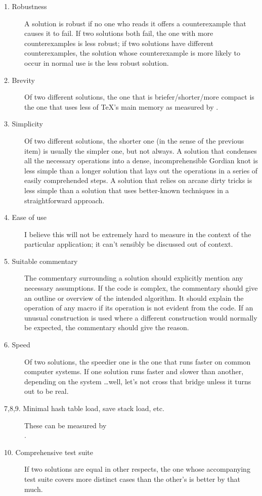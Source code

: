 \begin{description}
\item[1. Robustness] A solution is robust if no one who reads it offers a
counterexample that causes it to fail.  If two solutions both fail, the
one with more counterexamples is less robust; if two solutions have
different counterexamples, the solution whose counterexample is more
likely to occur in normal use is the less robust solution.

\item[2. Brevity] Of two different solutions, the one that is
briefer/shorter/more compact is the one that uses less of TeX's main
memory as measured by \cmd{\tracingstats}.

\item[3. Simplicity] Of two different solutions, the shorter one (in the
sense of the previous item) is usually the simpler one, but not always.
A solution that condenses all the necessary operations into a dense,
incomprehensible Gordian knot is less simple than a longer solution
that lays out the operations in a series of easily comprehended steps.
A solution that relies on arcane dirty tricks is less simple than a
solution that uses better-known techniques in a straightforward
approach.

\item[4. Ease of use] I believe this will not be extremely hard to measure in
the context of the particular application; it can't sensibly be
discussed out of context.

\item[5. Suitable commentary] The commentary surrounding a solution should
explicitly mention any necessary assumptions. If the code is complex,
the commentary should give an outline or overview of the intended
algorithm. It should explain the operation of any macro if its
operation is not evident from the code. If an unusual construction is
used where a different construction would normally be expected, the
commentary should give the reason.

\item[6. Speed] Of two solutions, the speedier one is the one that runs
faster on common computer systems. If one solution runs faster and
slower than another, depending on the system \ldots well, let's not cross
that bridge unless it turns out to be real.

\item[7,8,9. Minimal hash table load, save stack load, etc.] These can be
measured by \\
\cmd{\tracingstats}.

\item[10. Comprehensive test suite] If two solutions are equal in other
respects, the one whose accompanying test suite covers more distinct
cases than the other's is better by that much.
\end{description}

